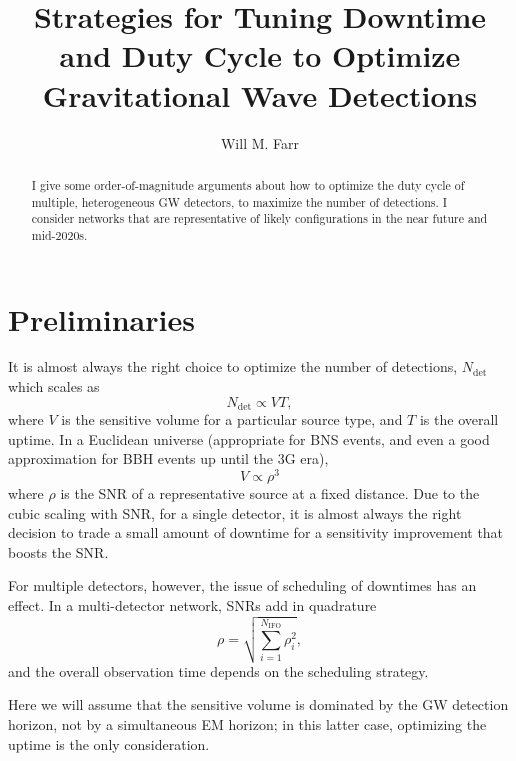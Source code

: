 \documentclass[modern]{aastex63}
\begin{document}
\title{Strategies for Tuning Downtime and Duty Cycle to Optimize Gravitational
Wave Detections}
\author[0000-0003-1540-8562]{Will M. Farr}

\begin{abstract} I give some order-of-magnitude arguments about how to optimize
the duty cycle of multiple, heterogeneous GW detectors, to maximize the number
of detections.  I consider networks that are representative of likely
configurations in the near future and mid-2020s. \end{abstract}

\section{Preliminaries}

It is almost always the right choice to optimize the number of detections,
$N_\mathrm{det}$ which scales as
%
\begin{equation}
  N_\mathrm{det} \propto V T,
\end{equation}
%
where $V$ is the sensitive volume for a particular source type, and $T$ is the
overall uptime.  In a Euclidean universe (appropriate for \ac{BNS} events, and
even a good approximation for \ac{BBH} events up until the 3G era),
%
\begin{equation}
  V \propto \rho^3
\end{equation}
%
where $\rho$ is the \ac{SNR} of a representative source at a fixed distance. Due
to the cubic scaling with \ac{SNR}, for a single detector, it is almost always
the right decision to trade a small amount of downtime for a sensitivity
improvement that boosts the \ac{SNR}.

For multiple detectors, however, the issue of scheduling of downtimes has an
effect.  In a multi-detector network, \acp{SNR} add in quadrature
%
\begin{equation}
  \rho = \sqrt{\sum_{i=1}^{N_\mathrm{IFO}} \rho_i^2},
\end{equation}
%
and the overall observation time depends on the scheduling strategy.

Here we will assume that the sensitive volume is dominated by the \ac{GW}
detection horizon, not by a simultaneous \ac{EM} horizon; in this latter case,
optimizing the uptime is the only consideration.
\end{document}
